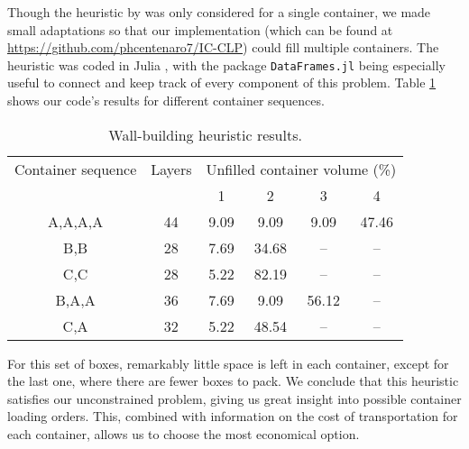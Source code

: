 \documentclass{pssbmac}
\begin{document}
Though the heuristic by \textcite{George1980} was only considered for a single container, we made small adaptations so that our implementation (which can be found at \url{https://github.com/phcentenaro7/IC-CLP}) could fill multiple containers. The heuristic was coded in Julia \cite{Bezanson2017}, with the package \texttt{DataFrames.jl} \cite{Valat2023} being especially useful to connect and keep track of every component of this problem. Table \ref{results} shows our code's results for different container sequences.

\begin{table}[H]
    \caption{ {\small Wall-building heuristic results.}}
    \centering
    \begin{tabular}{cccccc}
    \hline
    Container sequence & Layers & \multicolumn{4}{c}{Unfilled container volume (\%)}\\ \cline{3-6}
    & & 1 & 2 & 3 & 4\\ \hline
    A,A,A,A & 44 & 9.09 & 9.09 & 9.09 & 47.46\\
    B,B & 28 & 7.69 & 34.68 & -- & --\\
    C,C & 28 & 5.22 & 82.19 & -- & --\\
    B,A,A & 36 & 7.69 & 9.09 & 56.12 & --\\
    C,A & 32 & 5.22 & 48.54 & -- & --\\
    \hline
    \end{tabular}\label{results}
\end{table}

For this set of boxes, remarkably little space is left in each container, except for the last one, where there are fewer boxes to pack. We conclude that this heuristic satisfies our unconstrained problem, giving us great insight into possible container loading orders. This, combined with information on the cost of transportation for each container, allows us to choose the most economical option.


\end{document}
